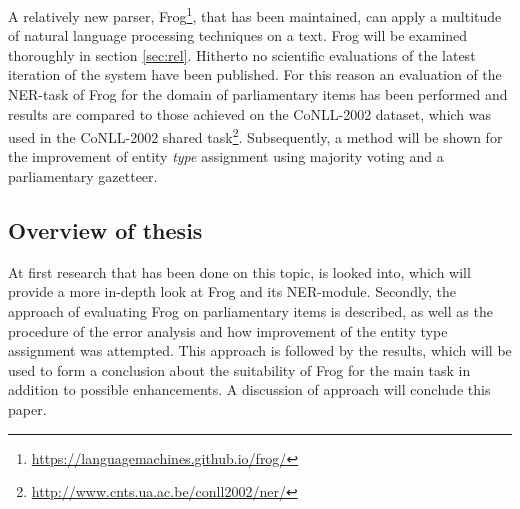 A relatively new parser, Frog\footnote{\url{https://languagemachines.github.io/frog/}}, that has been maintained, can apply a multitude of natural language processing techniques on a text. Frog will be examined thoroughly in section \ref{sec:rel}. Hitherto no scientific evaluations of the latest iteration of the system have been published. For this reason an evaluation of  the NER-task of Frog for the domain of parliamentary items has been performed and results are compared to those achieved on the CoNLL-2002 dataset, which was used in the CoNLL-2002 shared task\footnote{\url{http://www.cnts.ua.ac.be/conll2002/ner/}}. Subsequently, a method will be shown for the improvement of entity \textit{type} assignment using majority voting and a parliamentary gazetteer.

\subsection{Overview of thesis}
At first research that has been done on this topic, is looked into, which will provide a more in-depth look at Frog and its NER-module. Secondly, the approach of evaluating Frog on parliamentary items is described, as well as the procedure of the error analysis and how improvement of the entity type assignment was attempted. This approach is followed by the results, which will be used to form a conclusion about the suitability of Frog for the main task in addition to possible enhancements. A discussion of approach will conclude this paper.
